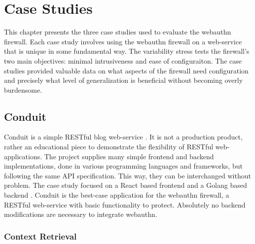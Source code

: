 
\chapter{Case Studies}

This chapter presents the three case studies used to evaluate the webauthn firewall. Each case study involves using the webauthn firewall on a web-service that is unique in some fundamental way. The variability stress tests the firewall's two main objectives: minimal intrusiveness and ease of configuraiton. The case studies provided valuable data on what aspects of the firewall need configuration and precisely what level of generalization is beneficial without becoming overly burdensome.

\section{Conduit}

Conduit is a simple RESTful blog web-service \cite{TODO-conduit}. It is not a production product, rather an educational piece to demonstrate the flexibility of RESTful web-applications. The project supplies many simple frontend and backend implementations, done in various programming languages and frameworks, but following the same API specification. This way, they can be interchanged without problem. The case study focused on a React based frontend \cite{TODO-Conduit-React-Frontend} and a Golang based backend \cite{TODO-Conduit-Go-Backend}. Conduit is the best-case application for the webauthn firewall, a RESTful web-service with basic functionality to protect. Absolutely no backend modifications are necessary to integrate webauthn.


\subsection{Context Retrieval}\label{Sec:Conduit_ContextRetrieval}

